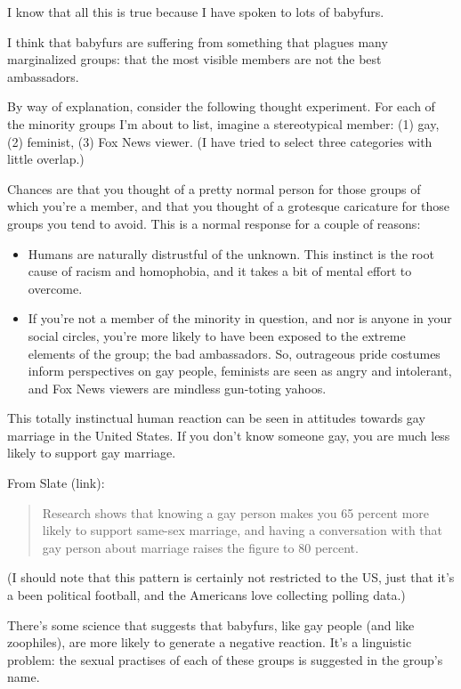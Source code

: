 I know that all this is true because I have spoken to lots of babyfurs.

I think that babyfurs are suffering from something that plagues many marginalized groups: that the most visible members are not the best ambassadors.

By way of explanation, consider the following thought experiment. For each of the minority groups I'm about to list, imagine a stereotypical member: (1) gay, (2) feminist, (3) Fox News viewer. (I have tried to select three categories with little overlap.)

Chances are that you thought of a pretty normal person for those groups of which you're a member, and that you thought of a grotesque caricature for those groups you tend to avoid. This is a normal response for a couple of reasons:

\begin{itemize}
  \item Humans are naturally distrustful of the unknown. This instinct is the root cause of racism and homophobia, and it takes a bit of mental effort to overcome.
  \item If you're not a member of the minority in question, and nor is anyone in your social circles, you're more likely to have been exposed to the extreme elements of the group; the bad ambassadors. So, outrageous pride costumes inform perspectives on gay people, feminists are seen as angry and intolerant, and Fox News viewers are mindless gun-toting yahoos.
\end{itemize}

This totally instinctual human reaction can be seen in attitudes towards gay marriage in the United States. If you don't know someone gay, you are much less likely to support gay marriage.

From Slate (link):

\begin{quote}
  Research shows that knowing a gay person makes you 65 percent more likely to support same-sex marriage, and having a conversation with that gay person about marriage raises the figure to 80 percent.
\end{quote}

(I should note that this pattern is certainly not restricted to the US, just that it's a been political football, and the Americans love collecting polling data.)

There's some science that suggests that babyfurs, like gay people (and like zoophiles), are more likely to generate a negative reaction. It's a linguistic problem: the sexual practises of each of these groups is suggested in the group's name.

